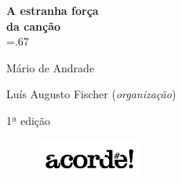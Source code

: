 




\begingroup\thispagestyle{empty}\vspace*{-.01\textheight}\parindent=0pt 
              \formular
              \huge 
              \textbf{A estranha força\\da canção}\\\baselineskip=.67\baselineskip 

              \medskip
              
              \LARGE
              Mário de Andrade
              
              \vspace{4cm}              

              \newfontfamily{}
              {\selectfont\minion\small Luís Augusto Fischer (\textit{organização})}
              
              \vspace{0.5cm}

              {\selectfont\minion\footnotesize
              1ª edição}
                    
              \vfill
              
              \begin{figure}
              \vspace*{-1.22\baselineskip}
              \includegraphics[width=3.5cm]{./logoacorde.png}
              \end{figure}

